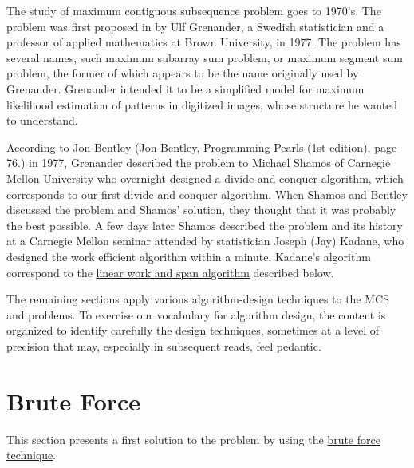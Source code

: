 \begin{note}
\label{not:mcss::introduction::mcss-history}

The study of  maximum contiguous subsequence problem goes to 1970's.  
%
The problem was first proposed in by Ulf Grenander, a Swedish
statistician and a professor of applied mathematics at Brown
University, in 1977.
%
The problem has several names, such maximum subarray sum problem, or
maximum segment sum problem, the former of which appears to be the
name originally used by Grenander.
%
Grenander intended it to be a simplified model for maximum likelihood
estimation of patterns in digitized images, whose structure he wanted
to understand.
%


According to Jon Bentley
%
(Jon Bentley, Programming Pearls (1st edition), page 76.)
%
in 1977, Grenander described the problem to Michael Shamos of
Carnegie Mellon University who overnight designed a divide and
conquer algorithm, which corresponds to our 
%
\href{alg:mcss::dc::first}{first divide-and-conquer algorithm}.
%
When Shamos and Bentley discussed the problem and Shamos' solution,
they thought that it was probably the best possible.
%
A few days later Shamos described the problem and its history at a
Carnegie Mellon seminar attended by statistician Joseph (Jay) Kadane,
who designed the work efficient algorithm within a minute.
%
Kadane's algorithm correspond to the 
%
\href{alg:mcs::iterative}{linear work and span algorithm} 
%
described below.
%



\end{note}


\begin{gram}[Roadmap]
\label{gr:mcss::problem::roadmap}
The remaining sections apply various algorithm-design
techniques to the MCS and \MCSS{} problems.
%
To exercise our vocabulary for algorithm design, the content is
organized to identify carefully the design techniques, sometimes at a
level of precision that may, especially in subsequent reads, feel
pedantic.
%
\end{gram}


\section{Brute Force}
\label{sec:mcss::bf}

\begin{gram}
This section presents a first solution to the \MCSS{} problem by using
the \href{sec:design::bf}{brute force technique}.
\end{gram}


